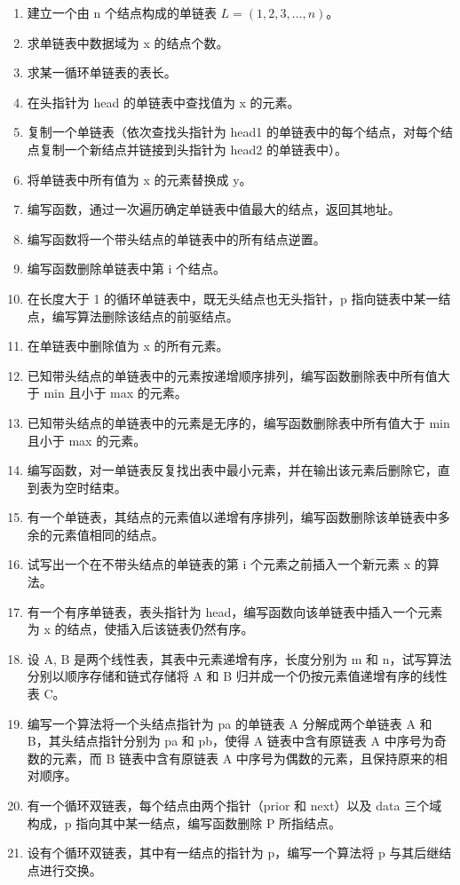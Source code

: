\documentclass[12pt, a4paper]{article}
\begin{document}
\begin{enumerate}
	\item 建立一个由 n 个结点构成的单链表 $L=(1, 2, 3, \dots, n)$。
	\item 求单链表中数据域为 x 的结点个数。
	\item 求某一循环单链表的表长。
	\item 在头指针为 head 的单链表中查找值为 x 的元素。
	\item 复制一个单链表（依次查找头指针为 head1 的单链表中的每个结点，对每个结点复制一个新结点并链接到头指针为 head2 的单链表中）。
	\item 将单链表中所有值为 x 的元素替换成 y。
	\item 编写函数，通过一次遍历确定单链表中值最大的结点，返回其地址。
	\item 编写函数将一个带头结点的单链表中的所有结点逆置。
	\item 编写函数删除单链表中第 i 个结点。
	\item 在长度大于 1 的循环单链表中，既无头结点也无头指针，p 指向链表中某一结点，编写算法删除该结点的前驱结点。
	\item 在单链表中删除值为 x 的所有元素。
	\item 已知带头结点的单链表中的元素按递增顺序排列，编写函数删除表中所有值大于 min 且小于 max 的元素。
	\item 已知带头结点的单链表中的元素是无序的，编写函数删除表中所有值大于 min 且小于 max 的元素。
	\item 编写函数，对一单链表反复找出表中最小元素，并在输出该元素后删除它，直到表为空时结束。
	\item 有一个单链表，其结点的元素值以递增有序排列，编写函数删除该单链表中多余的元素值相同的结点。
	\item 试写出一个在不带头结点的单链表的第 i 个元素之前插入一个新元素 x 的算法。
	\item 有一个有序单链表，表头指针为 head，编写函数向该单链表中插入一个元素为 x 的结点，使插入后该链表仍然有序。
	\item 设 A, B 是两个线性表，其表中元素递增有序，长度分别为 m 和 n，试写算法分别以顺序存储和链式存储将 A 和 B 归并成一个仍按元素值递增有序的线性表 C。
	\item 编写一个算法将一个头结点指针为 pa 的单链表 A 分解成两个单链表 A 和 B，其头结点指针分别为 pa 和 pb，使得 A 链表中含有原链表 A 中序号为奇数的元素，而 B 链表中含有原链表 A 中序号为偶数的元素，且保持原来的相对顺序。
	\item 有一个循环双链表，每个结点由两个指针（prior 和 next）以及 data 三个域构成，p 指向其中某一结点，编写函数删除 P 所指结点。
	\item 设有个循环双链表，其中有一结点的指针为 p，编写一个算法将 p 与其后继结点进行交换。
\end{enumerate}
\end{document}
